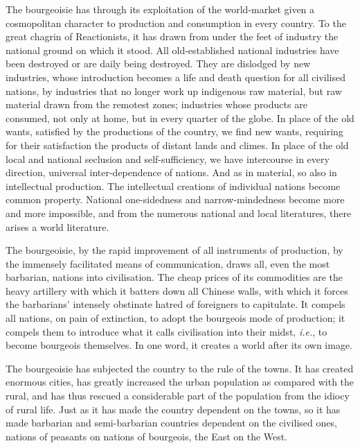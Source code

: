 The bourgeoisie has through its exploitation of the world-market given
a cosmopolitan character to production and consumption in every
country. To the great chagrin of Reactionists, it has drawn from under
the feet of industry the national ground on which it stood. All
old-established national industries have been destroyed or are daily
being destroyed. They are dislodged by new industries, whose
introduction becomes a life and death question for all civilised
nations, by industries that no longer work up indigenous raw material,
but raw material drawn from the remotest zones; industries whose
products are consumed, not only at home, but in every quarter of the
globe. In place of the old wants, satisfied by the productions of the
country, we find new wants, requiring for their satisfaction the
products of distant lands and climes. In place of the old local and
national seclusion and self-sufficiency, we have intercourse in every
direction, universal inter-dependence of nations. And as in material,
so also in intellectual production. The intellectual creations of
individual nations become common property. National one-sidedness and
narrow-mindedness become more and more impossible, and from the
numerous national and local literatures, there arises a world
literature.

The bourgeoisie, by the rapid improvement of all instruments of
production, by the immensely facilitated means of communication, draws
all, even the most barbarian, nations into civilisation. The cheap
prices of its commodities are the heavy artillery with which it batters
down all Chinese walls, with which it forces the barbarians’ intensely
obstinate hatred of foreigners to capitulate. It compels all nations,
on pain of extinction, to adopt the bourgeois mode of production; it
compels them to introduce what it calls civilisation into their midst,
\textit{i.e.}, to become bourgeois themselves. In one word, it creates a world
after its own image.

The bourgeoisie has subjected the country to the rule of the towns. It
has created enormous cities, has greatly increased the urban population
as compared with the rural, and has thus rescued a considerable part of
the population from the idiocy of rural life. Just as it has made the
country dependent on the towns, so it has made barbarian and
semi-barbarian countries dependent on the civilised ones, nations of
peasants on nations of bourgeois, the East on the West.

